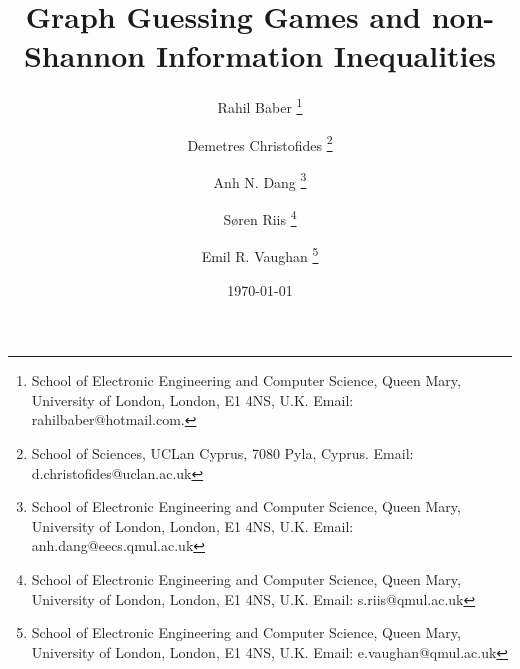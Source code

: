 \documentclass[a4paper, 14pt]{extarticle}
\theoremstyle{plain}
\begin{document}
\title{Graph Guessing Games and non-Shannon Information Inequalities }

\author{Rahil Baber
\thanks{School of Electronic Engineering and Computer Science,
Queen Mary, University of London, London, E1 4NS, U.K. Email: 
rahilbaber@hotmail.com.}
%
\and Demetres Christofides
\thanks{School of Sciences,
UCLan Cyprus, 7080 Pyla, Cyprus. Email:
d.christofides@uclan.ac.uk}
%
\and Anh N. Dang
\thanks{School of Electronic Engineering and Computer Science,
Queen Mary, University of London, London, E1 4NS, U.K. Email:
anh.dang@eecs.qmul.ac.uk}
%
\and S{\o}ren Riis
\thanks{School of Electronic Engineering and Computer Science,
Queen Mary, University of London, London, E1 4NS, U.K. Email:
s.riis@qmul.ac.uk}
%
\and Emil R. Vaughan
\thanks{School of Electronic Engineering and Computer Science,
Queen Mary, University of London, London, E1 4NS, U.K. Email:
e.vaughan@qmul.ac.uk} }


\date\today

\maketitle
\end{document}
